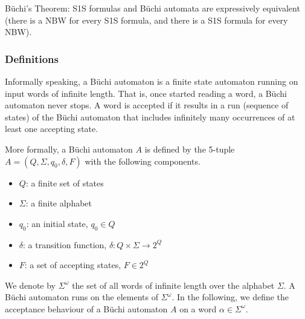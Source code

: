 Büchi's Theorem: S1S formulas and Büchi automata are expressively equivalent (there is a NBW for every S1S formula, and there is a S1S formula for every NBW).

\subsubsection{Definitions}
Informally speaking, a Büchi automaton is a finite state automaton running on input words of infinite length. That is, once started reading a word, a Büchi automaton never stops. A word is accepted if it results in a run (sequence of states) of the Büchi automaton that includes infinitely many occurrences of at least one accepting state.

More formally, a Büchi automaton $A$ is defined by the 5-tuple $A = (Q, \Sigma, q_0, \delta, F)$ with the following components.
\begin{itemize}
\item $Q$: a finite set of states
\item $\Sigma$: a finite alphabet
\item $q_0$: an initial state, $q_0 \in Q$
\item $\delta$: a transition function, $\delta: Q \times \Sigma \rightarrow 2^Q$ %
\item $F$: a set of accepting states, $F \in 2^Q$
\end{itemize}

We denote by $\Sigma^\omega$ the set of all words of infinite length over the alphabet $\Sigma$. A Büchi automaton runs on the elements of $\Sigma^\omega$. In the following, we define the acceptance behaviour of a Büchi automaton $A$ on a word $\alpha \in \Sigma^\omega$.



